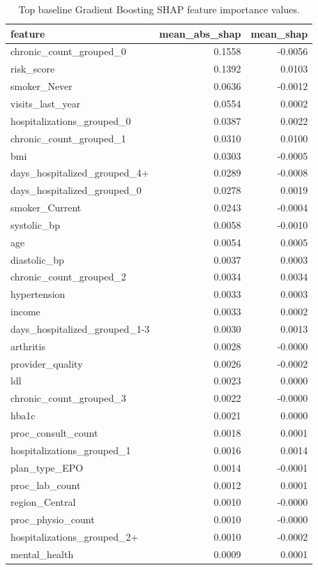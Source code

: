 \begin{table}
\caption{Top baseline Gradient Boosting SHAP feature importance values.}
\label{tab:05-gb-shap-importance}
\begin{tabular}{lrr}
\toprule
feature & mean_abs_shap & mean_shap \\
\midrule
chronic_count_grouped_0 & 0.1558 & -0.0056 \\
risk_score & 0.1392 & 0.0103 \\
smoker_Never & 0.0636 & -0.0012 \\
visits_last_year & 0.0554 & 0.0002 \\
hospitalizations_grouped_0 & 0.0387 & 0.0022 \\
chronic_count_grouped_1 & 0.0310 & 0.0100 \\
bmi & 0.0303 & -0.0005 \\
days_hospitalized_grouped_4+ & 0.0289 & -0.0008 \\
days_hospitalized_grouped_0 & 0.0278 & 0.0019 \\
smoker_Current & 0.0243 & -0.0004 \\
systolic_bp & 0.0058 & -0.0010 \\
age & 0.0054 & 0.0005 \\
diastolic_bp & 0.0037 & 0.0003 \\
chronic_count_grouped_2 & 0.0034 & 0.0034 \\
hypertension & 0.0033 & 0.0003 \\
income & 0.0033 & 0.0002 \\
days_hospitalized_grouped_1-3 & 0.0030 & 0.0013 \\
arthritis & 0.0028 & -0.0000 \\
provider_quality & 0.0026 & -0.0002 \\
ldl & 0.0023 & 0.0000 \\
chronic_count_grouped_3 & 0.0022 & -0.0000 \\
hba1c & 0.0021 & 0.0000 \\
proc_consult_count & 0.0018 & 0.0001 \\
hospitalizations_grouped_1 & 0.0016 & 0.0014 \\
plan_type_EPO & 0.0014 & -0.0001 \\
proc_lab_count & 0.0012 & 0.0001 \\
region_Central & 0.0010 & -0.0000 \\
proc_physio_count & 0.0010 & -0.0000 \\
hospitalizations_grouped_2+ & 0.0010 & -0.0002 \\
mental_health & 0.0009 & 0.0001 \\
\bottomrule
\end{tabular}
\end{table}
